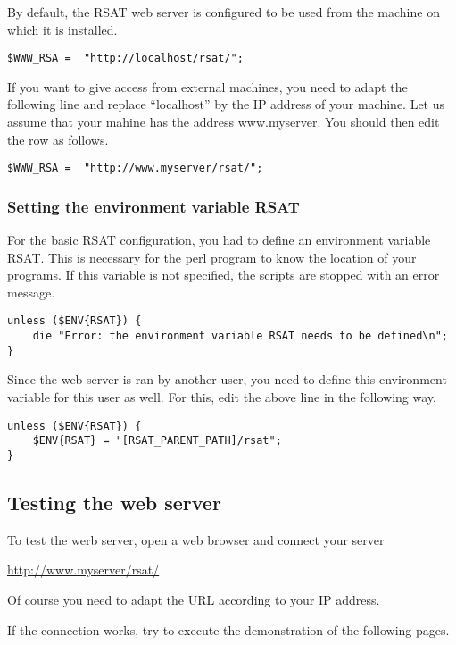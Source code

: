 \documentclass[12pt,a4paper, twoside]{scrreprt} %
\begin{document}
By default, the RSAT web server is configured to be used from the
machine on which it is installed. 

\begin{lstlisting}
$WWW_RSA = 	"http://localhost/rsat/";
\end{lstlisting}

If you want to give access from external machines, you need to adapt
the following line and replace ``localhost'' by the IP address of your
machine. Let us assume that your mahine has the address
www.myserver. You should then edit the row as follows.

\begin{lstlisting}
$WWW_RSA = 	"http://www.myserver/rsat/";
\end{lstlisting}

\subsubsection{Setting the environment variable RSAT}

For the basic RSAT configuration, you had to define an environment
variable RSAT. This is necessary for the perl program to know the
location of your programs. If this variable is not specified, the
scripts are stopped with an error message.

\begin{lstlisting}
unless ($ENV{RSAT}) {
    die "Error: the environment variable RSAT needs to be defined\n";
}
\end{lstlisting}

Since the web server is ran by another user, you need to define this
environment variable for this user as well. For this, edit the
above line in the following way.

\begin{lstlisting}
unless ($ENV{RSAT}) {
    $ENV{RSAT} = "[RSAT_PARENT_PATH]/rsat";
}
\end{lstlisting}


\subsection{Testing the web server}

To test the werb server, open a web browser and connect your \RSAT server

\url{http://www.myserver/rsat/} 

Of course you  need to adapt the URL according to your IP address.

If the connection works, try to execute the demonstration of the
following pages.
\end{document}
